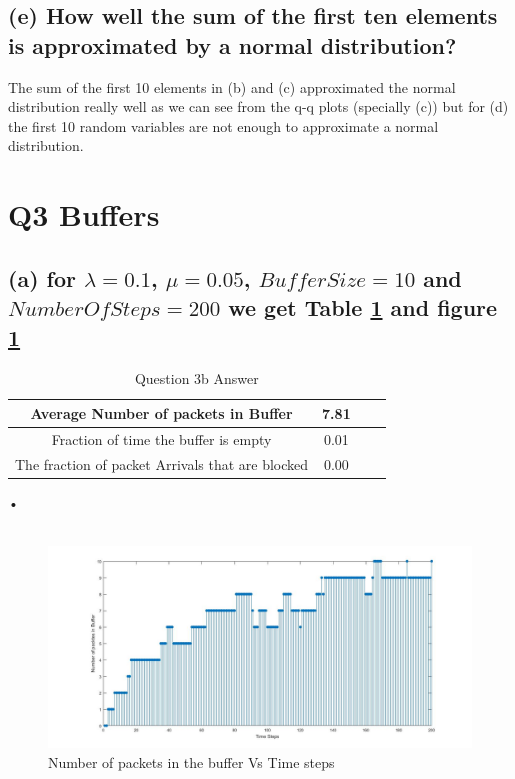 \documentclass[a4paper,11pt]{article}
\begin{document}
\subsection*{(e) How well the sum of the first ten elements is approximated by a normal distribution?}
The sum of the first 10 elements in (b) and (c) approximated the normal distribution really well as we can see from the q-q plots (specially (c)) but for (d) the first 10 random variables are not enough to approximate a normal distribution. 
\newpage
\clearpage
\section*{Q3 \quad Buffers}

\subsection*{(a) for $\lambda = 0.1$, $\mu=0.05$, $BufferSize=10$ and $NumberOf Steps=200$ we get Table \ref{tab:q3a} and figure \ref{fig:q3_a} }

\begin{table}
\centering
\begin{tabular}{ |c|c|c|c| } 
\hline
 Average Number of packets in Buffer& 7.81 \\
 \hline
 Fraction of time the buffer is empty& 0.01 \\
 \hline
 The fraction of packet Arrivals that are blocked& 0.00\\
\hline
\end{tabular}
\caption{Question 3b Answer } \label{tab:q3a}
\end{table}•\\\\
\begin{figure}[h]
   \hspace*{-6cm}
    \includegraphics[scale=0.5]{q3_1}
    \caption{Number of packets in the buffer Vs Time steps}\label{fig:q3_a}
\end{figure}
\end{document}
